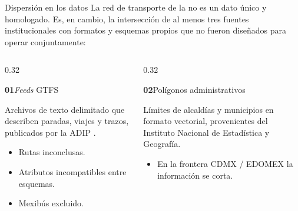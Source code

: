 \begin{frame}[t]{Dispersión en los datos}
  \small
  La red de transporte de la \zmvm{} no es un dato único y homologado. Es, en cambio, la intersección
  de al menos tres fuentes institucionales con formatos y esquemas propios que no fueron
  diseñados para operar conjuntamente:

  \begin{columns}[T]
    \begin{column}{0.32\textwidth}
      \begin{block}{\parbox[c][1.4em][c]{\linewidth}{\small\textbf{01}\enspace\textit{Feeds} GTFS}}
        \begin{minipage}[t][3.0cm][t]{\linewidth}\scriptsize
          Archivos de texto delimitado que describen paradas, viajes y trazos,
          publicados por la ADIP \citeyearpar{adip_gtfs_2024}.
          \vspace{-0.15cm}
          \begin{itemize}\setlength{\itemsep}{0pt}
            \item Rutas inconclusas.
            \item Atributos incompatibles entre esquemas.
            \item Mexibús excluido.
          \end{itemize}
        \end{minipage}
      \end{block}
    \end{column}
    \begin{column}{0.32\textwidth}
      \begin{block}{\parbox[c][1.4em][c]{\linewidth}{\small\textbf{02}\enspace Polígonos administrativos}}
        \begin{minipage}[t][3.0cm][t]{\linewidth}\scriptsize
          Límites de alcaldías y municipios en formato vectorial, provenientes del
          Instituto Nacional de Estadística y Geografía.
          \vspace{-0.15cm}
          \begin{itemize}\setlength{\itemsep}{0pt}
            \item En la frontera CDMX / EDOMEX la información se corta.
          \end{itemize}
        \end{minipage}

\end{block}
\end{column}
\end{columns}
\end{frame}

